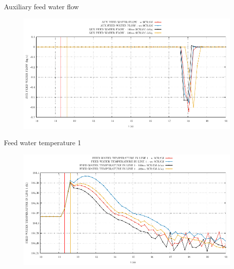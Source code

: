 \begin{frame}{Auxiliary feed water flow}
	\begin{figure}
		\centering
		\includegraphics[width=\textwidth]{./01PressureAccident/graphs/AUX FEED WATER FLOW_comp.pdf}
		
	\end{figure}
	
\end{frame}


\begin{frame}{Feed water temperature 1}
	\begin{figure}
		\centering
		\includegraphics[width=\textwidth]{./01PressureAccident/graphs/FEED WATER TEMPERATURE IN LINE 1_comp.pdf}
		
	\end{figure}
	
\end{frame}








